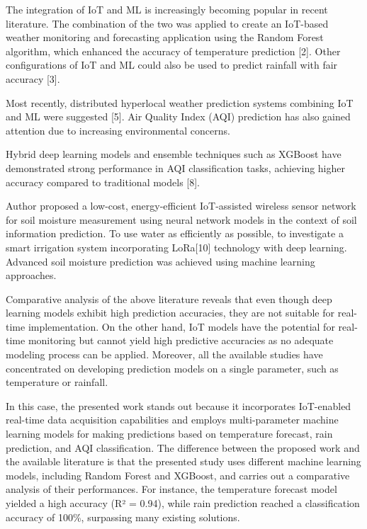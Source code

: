 \documentclass[conference]{IEEEtran}
\begin{document}
The integration of IoT and ML is increasingly becoming popular in recent literature. The combination of the two was applied to create an IoT-based weather monitoring and forecasting application using the Random Forest algorithm, which enhanced the accuracy of temperature prediction [2]. Other configurations of IoT and ML could also be used to predict rainfall with fair accuracy [3].

Most recently, distributed hyperlocal weather prediction systems combining IoT and ML were suggested [5]. Air Quality Index (AQI) prediction has also gained attention due to increasing environmental concerns. 

Hybrid deep learning models and ensemble techniques such as XGBoost have demonstrated strong performance in AQI classification tasks, achieving higher accuracy compared to traditional models [8].

Author proposed a low-cost, energy-efficient IoT-assisted wireless sensor network for soil moisture measurement using neural network models in the context of soil information prediction. To use water as efficiently as possible, to investigate a smart irrigation system incorporating LoRa[10] technology with deep learning. Advanced soil moisture prediction was achieved using machine learning approaches.

Comparative analysis of the above literature reveals that even though deep learning models exhibit high prediction accuracies, they are not suitable for real-time implementation. On the other hand, IoT models have the potential for real-time monitoring but cannot yield high predictive accuracies as no adequate modeling process can be applied. Moreover, all the available studies have concentrated on developing prediction models on a single parameter, such as temperature or rainfall.

In this case, the presented work stands out because it incorporates IoT-enabled real-time data acquisition capabilities and employs multi-parameter machine learning models for making predictions based on temperature forecast, rain prediction, and AQI classification. The difference between the proposed work and the available literature is that the presented study uses different machine learning models, including Random Forest and XGBoost, and carries out a comparative analysis of their performances. For instance, the temperature forecast model yielded a high accuracy (R² = 0.94), while rain prediction reached a classification accuracy of 100\%, surpassing many existing solutions.
\end{document}
